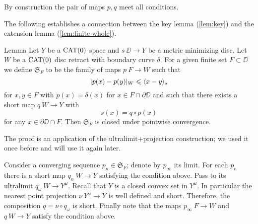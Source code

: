 By construction the pair of maps $p,q$ meet all conditions.
\qeds


The following establishes a connection between the 
key lemma (\ref{lem:key}) and the extension lemma (\ref{lem:finite-whole}).

\begin{thm}{Lemma}\label{lem:S-closed}
Let $Y$ be a $\mathop{\rm CAT}\nolimits(0)$ space and $s\:\DD\to Y$ 
be a metric minimizing disc. Let $W$ be a
$\mathop{\rm CAT}\nolimits(0)$ disc retract with boundary curve $\delta$. For a given 
finite set $F\subset \DD$ we define $\mathfrak{S}_F$ to be the family of maps  
 $p\:F\to W$ such that
\[|p(x)-p(y)|_W\leqslant \langle x-y\rangle_s\] 
for $x,y\in F$ with $p(x)=\delta(x)$ for $x\in F\cap \partial\DD$ and such that there exists
a short map $q\:W\to Y$ with
\[s(x)=q\circ p(x)\] 
for any $x\in\partial\DD\cap F$.
Then $\mathfrak{S}_F$ is closed under pointwise convergence. 
\end{thm}

The proof is an application of the ultralimit+projection construction;
we used it once before and will use it again later.

Consider a converging sequence $p_n\in  \mathfrak{S}_F$;
denote by $p_\infty$ its limit.
For each $p_n$ there is a short map $q_n\:W\to Y$ satisfying the condition above.
Pass to its ultralimit $q_\omega\:W\to Y^\omega$.
Recall that $Y$ is a closed convex set in $Y^\omega$.
In particular the nearest point projection $\nu\:Y^\omega\to Y$ is well defined and short.
Therefore, the composition $q=\nu\circ q_\omega$ is short.
Finally note that the maps $p_\infty\:F\to W$ and $q\:W\to Y$ satisfy the condition above.
\qeds

